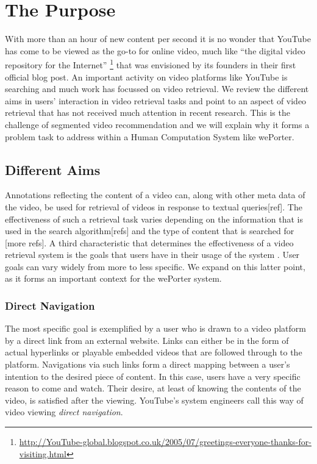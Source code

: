 \section{The Purpose}
\label{sec:weporter_purpose}

With more than an hour of new content per second it is no wonder that YouTube has come to be viewed as the go-to for online video, much like ``the digital video repository for the Internet'' \footnote{\url{http://YouTube-global.blogspot.co.uk/2005/07/greetings-everyone-thanks-for-visiting.html}} that was envisioned by its founders in their first official blog post. An important activity on video platforms like YouTube is searching and much work has focussed on video retrieval\cite{Liu:2007fv,Snoek:jf,Christel:2005td,Halvey:2007tz,Kankanhalli:2008uv,Hollink:2005ei,DeRooij:2008ut,Snoek:2009dq,Smeaton:2008go}. We review the different aims in users' interaction in video retrieval tasks and point to an aspect of video retrieval that has not received much attention in recent research. This is the challenge of segmented video recommendation and we will explain why it forms a problem task to address within a Human Computation System like wePorter.

\subsection{Different Aims}
Annotations reflecting the content of a video can, along with other meta data of the video, be used for retrieval of videos in response to textual queries[ref]. The effectiveness of such a retrieval task varies depending on the information that is used in the search algorithm[refs] and the type of content that is searched for \cite{Hollink:2005ei}[more refs]. A third characteristic that determines the effectiveness of a video retrieval system is the goals that users have in their usage of the system \cite{Hollink:2005ei}. User goals can vary widely from more to less specific\cite{Davidson:2010tu}. We expand on this latter point, as it forms an important context for the wePorter system.

\subsubsection{Direct Navigation}
The most specific goal is exemplified by a user who is drawn to a video platform by a direct link from an external website. Links can either be in the form of actual hyperlinks or playable embedded videos that are followed through to the platform. Navigations via such links form a direct mapping between a user's intention to the desired piece of content. In this case, users have a very specific reason to come and watch. Their desire, at least of knowing the contents of the video, is satisfied after the viewing. YouTube's system engineers call this way of video viewing \emph{direct navigation}\cite{Davidson:2010tu}.

